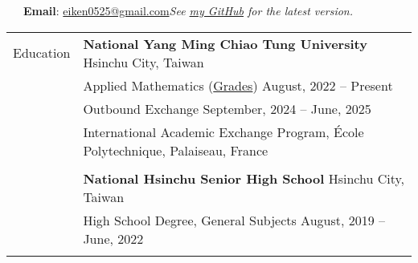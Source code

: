 \documentclass[letterpaper, 11pt]{article}
\begin{document}


\vspace{0.5cm} 
\noindent\:\ \ \ \textbf{Email}: \href{mailto:eiken0525@gmail.com}{eiken0525@gmail.com}\hfill \textit{\footnotesize See \href{https://github.com/eiken59/CV/blob/main/eiken59_CV.pdf}{my GitHub} for the latest version.\ \ \ \ \,}


\setlength{\tabcolsep}{8pt}
\vspace{-1.5em}
\begin{center}
    \begin{longtable}{p{0.76in}p{5.93in}}

        
        
        
        \textcolor{OliveGreen}{Education} 
        & \textbf{National Yang Ming Chiao Tung University} \hfill Hsinchu City, Taiwan \\ 
        & Applied Mathematics (\href{https://docs.google.com/spreadsheets/d/1hz9FwNdFio4EajAw5VN3lpa6QyxIE2GJ6FpHmMoSaaQ/edit?usp=sharing}{Grades}) \hfill August, 2022 -- Present \\
        & Outbound Exchange \hfill September, 2024 -- June, 2025\\
        & \qquad International Academic Exchange Program, \'Ecole Polytechnique, Palaiseau, France \\
        & \\
        
        & \textbf{National Hsinchu Senior High School} \hfill Hsinchu City, Taiwan \\
        & High School Degree, General Subjects \hfill August, 2019 -- June, 2022\\
        & \\
        
        

\end{longtable}
\end{center}
\end{document}
